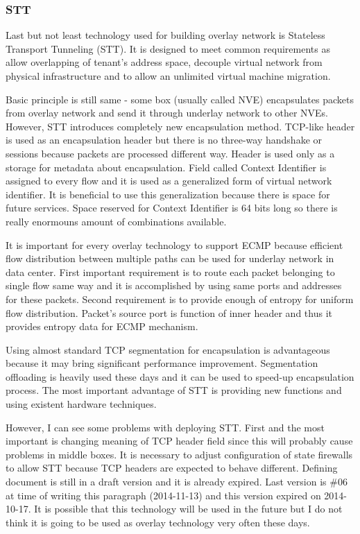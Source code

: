 \subsubsection{STT}
Last but not least technology used for building overlay network is Stateless Transport Tunneling (\Ac{STT}). It is designed to meet common requirements as allow overlapping of tenant's address space, decouple virtual network from physical infrastructure and to allow an unlimited virtual machine migration.

Basic principle is still same - some box (usually called \Ac{NVE}) encapsulates packets from overlay network and send it through underlay network to other \Ac{NVE}s. However, \Ac{STT} introduces completely new encapsulation method. \Ac{TCP}-like header is used as an encapsulation header but there is no three-way handshake or sessions because packets are processed different way. Header is used only as a storage for metadata about encapsulation. Field called Context Identifier is assigned to every flow and it is used as a generalized form of virtual network identifier. \cite{draft-stt} It is beneficial to use this generalization because there is space for future services. Space reserved for Context Identifier is 64 bits long so there is really enormouns amount of combinations available.

It is important for every overlay technology to support \Ac{ECMP} because efficient flow distribution between multiple paths can be used for underlay network in data center. First important requirement is to route each packet belonging to single flow same way and it is accomplished by using same ports and addresses for these packets. 
Second requirement is to provide enough of entropy for uniform flow distribution. Packet's source port is function of inner header and thus it provides entropy data for \Ac{ECMP} mechanism.

Using almost standard \Ac{TCP} segmentation for encapsulation is advantageous because it may bring significant performance improvement. Segmentation offloading is heavily used these days and it can be used to speed-up encapsulation process. The most important advantage of \Ac{STT} is providing new functions and using existent hardware techniques.

However, I can see some problems with deploying \Ac{STT}. First and the most important is changing meaning of \Ac{TCP} header field since this will probably cause problems in middle boxes. It is necessary to adjust configuration of state firewalls to allow \Ac{STT} because \Ac{TCP} headers are expected to behave different. Defining document \cite{draft-stt} is still in a draft version and it is already expired. Last version is \#06 at time of writing this paragraph (2014-11-13) and this version expired on 2014-10-17. It is possible that this technology will be used in the future but I do not think it is going to be used as overlay technology very often these days.

